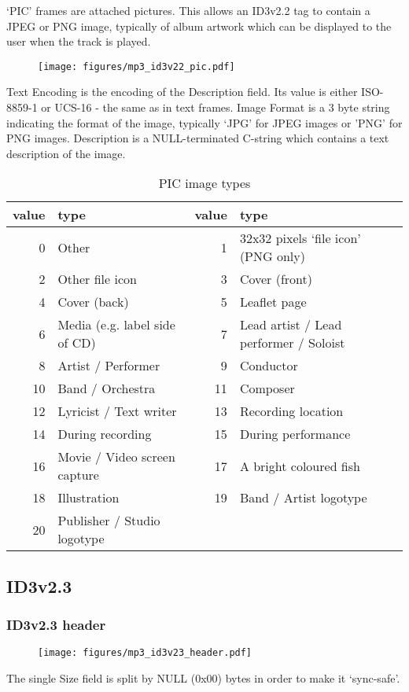 `PIC' frames are attached pictures.
This allows an ID3v2.2 tag to contain a JPEG or PNG image,
typically of album artwork which can be displayed to the user
when the track is played.

\begin{figure}[h]
\texttt{[image: figures/mp3\_id3v22\_pic.pdf]}
\end{figure}
\par
\noindent
Text Encoding is the encoding of the Description field.
Its value is either ISO-8859-1 or UCS-16 - the same as in
text frames.
Image Format is a 3 byte string indicating the format of the image,
typically `JPG' for JPEG images or 'PNG' for PNG images.
Description is a NULL-terminated C-string which contains
a text description of the image.

\begin{table}[h]
{
\begin{tabular}{|r|l||r|l|}
\hline
value & type & value & type \\
\hline
0 & Other & 1 & 32x32 pixels `file icon' (PNG only) \\
2 & Other file icon & 3 & Cover (front) \\
4 & Cover (back) & 5 & Leaflet page \\
6 & Media (e.g. label side of CD) & 7 & Lead artist / Lead performer / Soloist \\
8 & Artist / Performer & 9 & Conductor \\
10 & Band / Orchestra & 11 & Composer \\
12 & Lyricist / Text writer & 13 & Recording location \\
14 & During recording & 15 & During performance \\
16 & Movie / Video screen capture & 17 & A bright coloured fish \\
18 & Illustration & 19 & Band / Artist logotype \\
20 & Publisher / Studio logotype & &  \\
\hline
\end{tabular}
\caption{PIC image types}
}
\end{table}

\pagebreak

\subsection{ID3v2.3}
\subsubsection{ID3v2.3 header}
\begin{figure}[h]
\texttt{[image: figures/mp3\_id3v23\_header.pdf]}
\end{figure}
\par
\noindent
The single Size field is split by NULL (0x00) bytes in order to make
it `sync-safe'.

